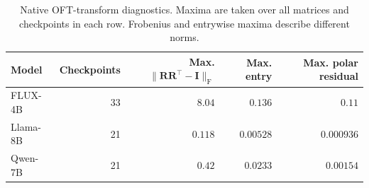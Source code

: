 \begin{table}[!htbp]\caption{Native OFT-transform diagnostics. Maxima are taken over all matrices and checkpoints in each row. Frobenius and entrywise maxima describe different norms.}\label{tab:peft-orthogonality}
\begin{center}
\begin{tabular}{lrrrr}\toprule Model & Checkpoints & Max. $\|\bm R\bm R^{\!\top}-\bm I\|_{\mathrm{F}}$ & Max. entry & Max. polar residual\\\midrule
FLUX-4B & 33 & $8.04$ & $0.136$ & $0.11$\\
Llama-8B & 21 & $0.118$ & $0.00528$ & $0.000936$\\
Qwen-7B & 21 & $0.42$ & $0.0233$ & $0.00154$\\
\bottomrule\end{tabular}
\end{center}
\end{table}
